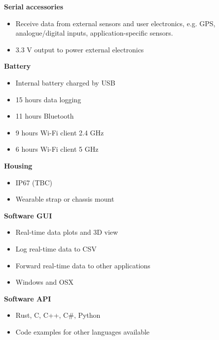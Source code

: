 \begin{multicols}{2}
\textbf{Serial accessories}
\begin{itemize}[nolistsep]
    \item Receive data from external sensors and user electronics, e.g. \acs{GPS}, analogue/digital inputs, application-specific sensors.
    \item 3.3 V output to power external electronics
\end{itemize}

\textbf{Battery}
\begin{itemize}[nolistsep]
    \item Internal battery charged by \acs{USB}
    \item 15 hours data logging
    \item 11 hours Bluetooth
    \item 9 hours Wi-Fi client 2.4 GHz
    \item 6 hours Wi-Fi client 5 GHz
\end{itemize}

\textbf{Housing}
\begin{itemize}[nolistsep]
    \item IP67 (TBC)
    \item Wearable strap or chassis mount
\end{itemize}

\textbf{Software \acs{GUI}}
\begin{itemize}[nolistsep]
    \item Real-time data plots and 3D view
    \item Log real-time data to \acs{CSV}
    \item Forward real-time data to other applications
    \item Windows and OSX
\end{itemize}

\textbf{Software \acs{API}}
\begin{itemize}[nolistsep]
    \item Rust, C, C++, C\#, Python
    \item Code examples for other languages available
\end{itemize}

\end{multicols}

\clearpage
